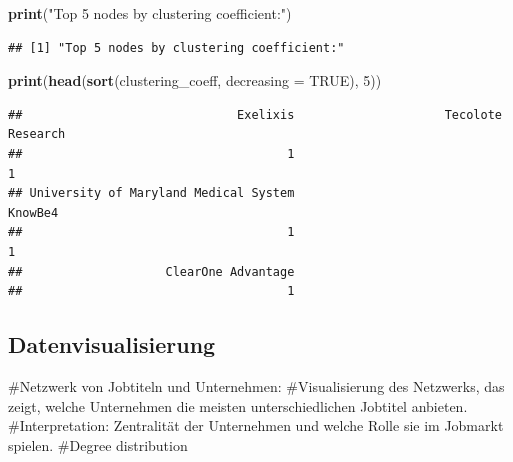 \documentclass[
]{article}
\newenvironment{Shaded}{\begin{snugshade}}{\end{snugshade}}
\newcommand{\AttributeTok}[1]{\textcolor[rgb]{0.13,0.29,0.53}{#1}}
\newcommand{\ConstantTok}[1]{\textcolor[rgb]{0.56,0.35,0.01}{#1}}
\newcommand{\DecValTok}[1]{\textcolor[rgb]{0.00,0.00,0.81}{#1}}
\newcommand{\FunctionTok}[1]{\textcolor[rgb]{0.13,0.29,0.53}{\textbf{#1}}}
\newcommand{\NormalTok}[1]{#1}
\newcommand{\StringTok}[1]{\textcolor[rgb]{0.31,0.60,0.02}{#1}}
\begin{document}
\begin{Shaded}
\begin{Highlighting}[]
\FunctionTok{print}\NormalTok{(}\StringTok{"Top 5 nodes by clustering coefficient:"}\NormalTok{)}
\end{Highlighting}
\end{Shaded}

\begin{verbatim}
## [1] "Top 5 nodes by clustering coefficient:"
\end{verbatim}

\begin{Shaded}
\begin{Highlighting}[]
\FunctionTok{print}\NormalTok{(}\FunctionTok{head}\NormalTok{(}\FunctionTok{sort}\NormalTok{(clustering\_coeff, }\AttributeTok{decreasing =} \ConstantTok{TRUE}\NormalTok{), }\DecValTok{5}\NormalTok{))}
\end{Highlighting}
\end{Shaded}

\begin{verbatim}
##                              Exelixis                     Tecolote Research 
##                                     1                                     1 
## University of Maryland Medical System                               KnowBe4 
##                                     1                                     1 
##                    ClearOne Advantage 
##                                     1
\end{verbatim}

\subsection{Datenvisualisierung}\label{datenvisualisierung}

\#Netzwerk von Jobtiteln und Unternehmen: \#Visualisierung des
Netzwerks, das zeigt, welche Unternehmen die meisten unterschiedlichen
Jobtitel anbieten. \#Interpretation: Zentralität der Unternehmen und
welche Rolle sie im Jobmarkt spielen. \#Degree distribution
\end{document}
